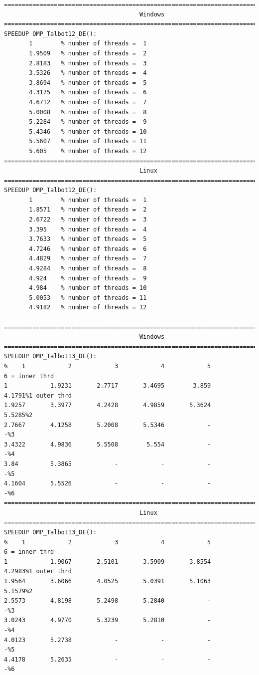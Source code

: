 \documentclass[a4paper,10pt]{report}%
\begin{document}
\begin{lstlisting}
====================================================================================
                                      Windows
====================================================================================
SPEEDUP OMP_Talbot12_DE():
       1        % number of threads =  1
       1.9509   % number of threads =  2
       2.8183   % number of threads =  3
       3.5326   % number of threads =  4
       3.8694   % number of threads =  5
       4.3175   % number of threads =  6
       4.6712   % number of threads =  7
       5.0008   % number of threads =  8
       5.2284   % number of threads =  9
       5.4346   % number of threads = 10
       5.5607   % number of threads = 11
       5.605    % number of threads = 12
====================================================================================
                                      Linux
====================================================================================
SPEEDUP OMP_Talbot12_DE():
       1        % number of threads =  1
       1.8571   % number of threads =  2
       2.6722   % number of threads =  3
       3.395    % number of threads =  4
       3.7633   % number of threads =  5
       4.7246   % number of threads =  6
       4.4829   % number of threads =  7
       4.9284   % number of threads =  8
       4.924    % number of threads =  9
       4.984    % number of threads = 10
       5.0053   % number of threads = 11
       4.9182   % number of threads = 12

====================================================================================
                                      Windows
====================================================================================
SPEEDUP OMP_Talbot13_DE():
%    1            2            3            4            5            6 = inner thrd
1            1.9231       2.7717       3.4695        3.859       4.1791%1 outer thrd
1.9257       3.3977       4.2428       4.9859       5.3624       5.5285%2
2.7667       4.1258       5.2008       5.5346            -            -%3
3.4322       4.9836       5.5508        5.554            -            -%4
3.84         5.3865            -            -            -            -%5
4.1604       5.5526            -            -            -            -%6
====================================================================================
                                      Linux
====================================================================================
SPEEDUP OMP_Talbot13_DE():
%    1            2            3            4            5            6 = inner thrd
1            1.9067       2.5101       3.5909       3.8554       4.2983%1 outer thrd
1.9564       3.6066       4.0525       5.0391       5.1063       5.1579%2
2.5573       4.8198       5.2498       5.2840            -            -%3
3.0243       4.9770       5.3239       5.2810            -            -%4
4.0123       5.2738            -            -            -            -%5
4.4178       5.2635            -            -            -            -%6
\end{lstlisting}
\end{document}
